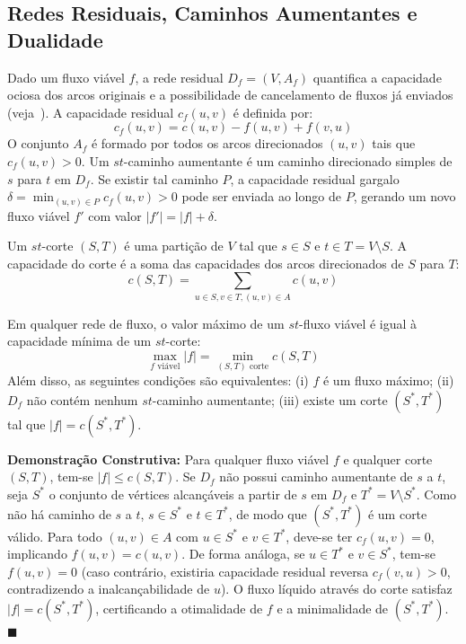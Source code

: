 \subsection{Redes Residuais, Caminhos Aumentantes e Dualidade}

Dado um fluxo viável $f$, a rede residual $D_f = (V, A_f)$ quantifica a capacidade ociosa dos arcos originais e a possibilidade de cancelamento de fluxos já enviados (veja~\cite{ahuja1993network}). A capacidade residual $c_f(u, v)$ é definida por:
\begin{equation}
    c_f(u, v) = c(u, v) - f(u, v) + f(v, u)
\end{equation}
O conjunto $A_f$ é formado por todos os arcos direcionados $(u, v)$ tais que $c_f(u, v) > 0$. Um $st$-caminho aumentante é um caminho direcionado simples de $s$ para $t$ em $D_f$. Se existir tal caminho $P$, a capacidade residual gargalo $\delta = \min_{(u, v) \in P} c_f(u, v) > 0$ pode ser enviada ao longo de $P$, gerando um novo fluxo viável $f'$ com valor $|f'| = |f| + \delta$.

Um $st$-corte $(S, T)$ é uma partição de $V$ tal que $s \in S$ e $t \in T = V \setminus S$. A capacidade do corte é a soma das capacidades dos arcos direcionados de $S$ para $T$:
\begin{equation}
    c(S, T) = \sum_{u \in S, v \in T, (u, v) \in A} c(u, v)
\end{equation}

\begin{prop}\label{prop:mfmc_rel}
Em qualquer rede de fluxo, o valor máximo de um $st$-fluxo viável é igual à capacidade mínima de um $st$-corte:
\begin{equation}
    \max_{f \text{ viável}} |f| = \min_{(S, T) \text{ corte}} c(S, T)
\end{equation}
Além disso, as seguintes condições são equivalentes: (i) $f$ é um fluxo máximo; (ii) $D_f$ não contém nenhum $st$-caminho aumentante; (iii) existe um corte $(S^*, T^*)$ tal que $|f| = c(S^*, T^*)$.
\end{prop}

\noindent \textbf{Demonstração Construtiva:} Para qualquer fluxo viável $f$ e qualquer corte $(S, T)$, tem-se $|f| \le c(S, T)$. Se $D_f$ não possui caminho aumentante de $s$ a $t$, seja $S^*$ o conjunto de vértices alcançáveis a partir de $s$ em $D_f$ e $T^* = V \setminus S^*$. Como não há caminho de $s$ a $t$, $s \in S^*$ e $t \in T^*$, de modo que $(S^*, T^*)$ é um corte válido. Para todo $(u, v) \in A$ com $u \in S^*$ e $v \in T^*$, deve-se ter $c_f(u, v) = 0$, implicando $f(u, v) = c(u, v)$. De forma análoga, se $u \in T^*$ e $v \in S^*$, tem-se $f(u, v) = 0$ (caso contrário, existiria capacidade residual reversa $c_f(v, u) > 0$, contradizendo a inalcançabilidade de $u$). O fluxo líquido através do corte satisfaz $|f| = c(S^*, T^*)$, certificando a otimalidade de $f$ e a minimalidade de $(S^*, T^*)$. \hfill $\blacksquare$

